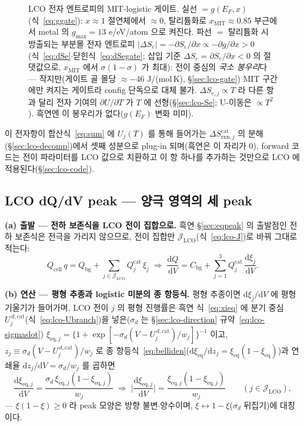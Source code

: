 \documentclass[11pt,a4paper]{article}
\newcommand{\dd}{\mathrm{d}}
\newcommand{\eq}{\mathrm{eq}}
\newcommand{\cell}{\mathrm{cell}}
\newcommand{\bg}{\mathrm{bg}}
\newcommand{\rxn}{\mathrm{rxn}}
\begin{document}
\begin{figure}[t]
\caption{LCO 전자 엔트로피의 MIT-logistic 게이트. 실선 $=g(E_F,x)$(식~\eqref{eq:ggate}): $x\!\approx\!1$
절연체에서 $\approx0$, 탈리튬화로 $x_\mathrm{MIT}\!\approx\!0.85$ 부근에서 metal 의 $g_{\max}\!=\!13$ e/eV/atom 으로 켜진다.
파선 $=$ 탈리튬화 시 방출되는 부분몰 전자 엔트로피 $|\Delta S_e|=-\partial S_e/\partial x\propto-\partial g/\partial x>0$
(식~\eqref{eq:dSe}$\cdot$닫힌식~\eqref{eq:dSegate}; 삽입 기준 $\Delta S_e=\partial S_e/\partial x<0$ 의 절댓값으로,
$x_\mathrm{MIT}$ 에서 $\sigma(1-\sigma)$ 가 최대): 전이 중심의 \emph{국소
봉우리}다 — 작지만(게이트 골 몰당 $\approx-46$ J/(mol\,K), \S\ref{sec:lco-gate}) MIT 구간에만 켜지는 게이트라 config 단독으로 대체 불가.
$\Delta S_{e,j}\propto T$ 라 다른 항과 달리 전자 기여의 $\partial U/\partial T$ 가 $T$ 에 선형(\S\ref{sec:lco-Se}; U-이동은
$\propto T^2$). 흑연엔 이 봉우리가 없다($g(E_F)$ 변화 미미).}
\label{fig:lco-electronic}
\end{figure}

이 전자항이 합산식~\eqref{eq:sum} 에 $U_j(T)$ 를 통해 들어가는 $\Delta S_{\rxn,j}^\mathrm{cat}$ 의 분해
(\S\ref{sec:lco-decomp})에서 셋째 성분으로 plug-in 되며(흑연은 이 자리가 0),
forward 코드는 전이 파라미터를 LCO 값으로 치환하고 이 항 하나를 추가하는 것만으로 LCO 에 적용된다(\S\ref{sec:lco-code}).

\subsection{LCO dQ/dV peak — 양극 영역의 세 peak}\label{sec:lco-peak}
\textbf{(a) 출발 — 전하 보존식을 LCO 전이 집합으로.} 흑연 \S\ref{sec:eqpeak} 의 출발점인 전하 보존식은
전극을 가리지 않으므로, 전이 집합만 $\mathcal J_\mathrm{LCO}$(식~\eqref{eq:lco-J})로 바꿔 그대로 적는다:
\begin{equation}
Q_\cell\,q=Q_\bg+\sum_{j\in\mathcal J_\mathrm{LCO}}Q_j^\mathrm{cat}\,\xi_j
\;\Longrightarrow\;
\frac{\dd Q}{\dd V}=C_\bg+\sum_{j=1}^{3}Q_j^\mathrm{cat}\,\frac{\dd\xi_j}{\dd V}.
\label{eq:lco-charge}
\end{equation}

\textbf{(b) 연산 — 평형 추종과 logistic 미분의 종 항등식.} 평형 추종이면 $\dd\xi_j/\dd V$ 에 평형 기울기가 들어가며, LCO 전이 $j$ 의 평형 진행률은 흑연 식~\eqref{eq:xieq}
에 분기 중심 $U_j^{\,d,\mathrm{cat}}$(식~\eqref{eq:lco-Ubranch})을 넣은($\sigma_d$ 는 \S\ref{sec:lco-direction} 규약~\eqref{eq:lco-sigmaslot})
$\xi_{\eq,j}=\{1+\exp[-\sigma_d(V-U_j^{\,d,\mathrm{cat}})/w_j]\}^{-1}$ 이고, $z_j\equiv\sigma_d(V-U_j^{\,d,
\mathrm{cat}})/w_j$ 로 종 항등식~\eqref{eq:belliden}($\dd\xi_\eq/\dd z_j=\xi_\eq(1-\xi_\eq)$)과 연쇄율
$\dd z_j/\dd V=\sigma_d/w_j$ 를 곱하면
\begin{equation}
\frac{\dd\xi_{\eq,j}}{\dd V}=\frac{\sigma_d\,\xi_{\eq,j}(1-\xi_{\eq,j})}{w_j}
\;\Longrightarrow\;
\Big|\frac{\dd\xi_{\eq,j}}{\dd V}\Big|=\frac{\xi_{\eq,j}(1-\xi_{\eq,j})}{w_j}
\qquad(j\in\mathcal J_\mathrm{LCO}),
\label{eq:lco-belliden}
\end{equation}
— $\xi(1-\xi)\ge0$ 라 peak 모양은 방향 불변$\cdot$양수이며, $\xi\leftrightarrow1-\xi$($\sigma_d$ 뒤집기)에
대칭이다.
\end{document}
